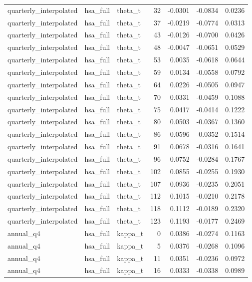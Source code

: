 \begin{tabular}{lllrrrr}
quarterly\_interpolated & hsa\_full & theta\_t & 32 & -0.0301 & -0.0834 & 0.0236 \\
quarterly\_interpolated & hsa\_full & theta\_t & 37 & -0.0219 & -0.0774 & 0.0313 \\
quarterly\_interpolated & hsa\_full & theta\_t & 43 & -0.0126 & -0.0700 & 0.0426 \\
quarterly\_interpolated & hsa\_full & theta\_t & 48 & -0.0047 & -0.0651 & 0.0529 \\
quarterly\_interpolated & hsa\_full & theta\_t & 53 & 0.0035 & -0.0618 & 0.0644 \\
quarterly\_interpolated & hsa\_full & theta\_t & 59 & 0.0134 & -0.0558 & 0.0792 \\
quarterly\_interpolated & hsa\_full & theta\_t & 64 & 0.0226 & -0.0505 & 0.0947 \\
quarterly\_interpolated & hsa\_full & theta\_t & 70 & 0.0331 & -0.0459 & 0.1088 \\
quarterly\_interpolated & hsa\_full & theta\_t & 75 & 0.0417 & -0.0414 & 0.1222 \\
quarterly\_interpolated & hsa\_full & theta\_t & 80 & 0.0503 & -0.0367 & 0.1360 \\
quarterly\_interpolated & hsa\_full & theta\_t & 86 & 0.0596 & -0.0352 & 0.1514 \\
quarterly\_interpolated & hsa\_full & theta\_t & 91 & 0.0678 & -0.0316 & 0.1641 \\
quarterly\_interpolated & hsa\_full & theta\_t & 96 & 0.0752 & -0.0284 & 0.1767 \\
quarterly\_interpolated & hsa\_full & theta\_t & 102 & 0.0855 & -0.0255 & 0.1930 \\
quarterly\_interpolated & hsa\_full & theta\_t & 107 & 0.0936 & -0.0235 & 0.2051 \\
quarterly\_interpolated & hsa\_full & theta\_t & 112 & 0.1015 & -0.0210 & 0.2178 \\
quarterly\_interpolated & hsa\_full & theta\_t & 118 & 0.1112 & -0.0189 & 0.2320 \\
quarterly\_interpolated & hsa\_full & theta\_t & 123 & 0.1193 & -0.0177 & 0.2469 \\
annual\_q4 & hsa\_full & kappa\_t & 0 & 0.0386 & -0.0274 & 0.1163 \\
annual\_q4 & hsa\_full & kappa\_t & 5 & 0.0376 & -0.0268 & 0.1096 \\
annual\_q4 & hsa\_full & kappa\_t & 11 & 0.0351 & -0.0236 & 0.0972 \\
annual\_q4 & hsa\_full & kappa\_t & 16 & 0.0333 & -0.0338 & 0.0989 \\

\end{tabular}
